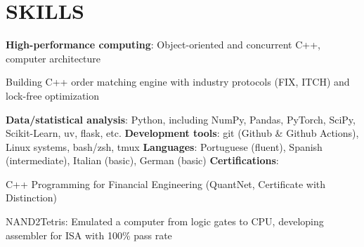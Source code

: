 \section{SKILLS}
\textbf{High-performance computing}: Object-oriented and concurrent C++, computer architecture
\begin{onecolentry}
    \begin{highlights}
        \item Building C++ order matching engine with industry protocols (FIX, ITCH) and lock-free optimization 
    \end{highlights}
\end{onecolentry}
\textbf{Data/statistical analysis}: Python, including NumPy, Pandas, PyTorch, SciPy, Scikit-Learn, uv, flask, etc.
\textbf{Development tools}: git (Github \& Github Actions), Linux systems, bash/zsh, tmux
\textbf{Languages}: Portuguese (fluent), Spanish (intermediate), Italian (basic), German (basic) \newline
\textbf{Certifications}:
\begin{onecolentry}
    \begin{highlights}
        \item C++ Programming for Financial Engineering (QuantNet, Certificate with Distinction)
        \item NAND2Tetris: Emulated a computer from logic gates to CPU, developing assembler for ISA with 100\% pass rate
    \end{highlights}
\end{onecolentry}
